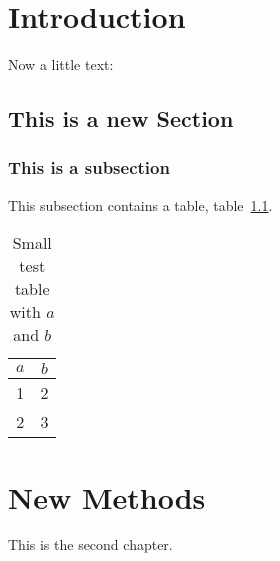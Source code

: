 \documentclass{csuthesis}
\begin{document}
{\begin{description}
\end{description}
}


\mainmatter %

\chapter{Introduction}

Now a little text: \lipsum[1]

\section{This is a new Section}

\subsection{This is a subsection}

This subsection contains a table, table~\ref{table:smalltab}. \lipsum[1-2]

\begin{table}
\caption[Small Table]{Small test table with $a$ and $b$}
\label{table:smalltab}
\begin{tabular}{c|c}
$a$ & $b$ \\
\hline
1 & 2 \\
2 & 3 \\
\end{tabular}
\end{table}

\chapter{New Methods}

This is the second chapter. 
\end{document}
